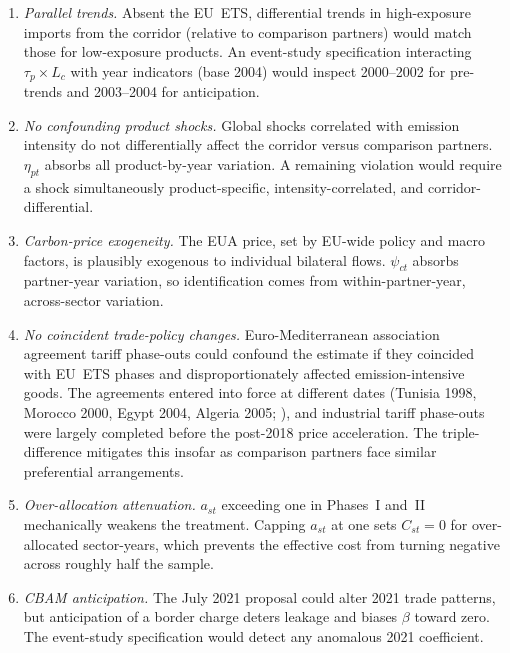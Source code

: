 \begin{enumerate}

\item \emph{Parallel trends.} Absent the EU~ETS, differential trends in high-exposure imports from the corridor (relative to comparison partners) would match those for low-exposure products. An event-study specification interacting $\tau_p \times L_c$ with year indicators (base 2004) would inspect 2000--2002 for pre-trends and 2003--2004 for anticipation.

\item \emph{No confounding product shocks.} Global shocks correlated with emission intensity do not differentially affect the corridor versus comparison partners. $\eta_{pt}$ absorbs all product-by-year variation. A remaining violation would require a shock simultaneously product-specific, intensity-correlated, and corridor-differential.

\item \emph{Carbon-price exogeneity.} The EUA price, set by EU-wide policy and macro factors, is plausibly exogenous to individual bilateral flows. $\psi_{ct}$ absorbs partner-year variation, so identification comes from within-partner-year, across-sector variation.

\item \emph{No coincident trade-policy changes.} Euro-Mediterranean association agreement tariff phase-outs could confound the estimate if they coincided with EU~ETS phases and disproportionately affected emission-intensive goods. The agreements entered into force at different dates (Tunisia 1998, Morocco 2000, Egypt 2004, Algeria 2005; \citealp{eumed}), and industrial tariff phase-outs were largely completed before the post-2018 price acceleration. The triple-difference mitigates this insofar as comparison partners face similar preferential arrangements.

\item \emph{Over-allocation attenuation.} $a_{st}$ exceeding one in Phases~I and~II mechanically weakens the treatment. Capping $a_{st}$ at one sets $C_{st} = 0$ for over-allocated sector-years, which prevents the effective cost from turning negative across roughly half the sample.

\item \emph{CBAM anticipation.} The July 2021 proposal could alter 2021 trade patterns, but anticipation of a border charge deters leakage and biases $\beta$ toward zero. The event-study specification would detect any anomalous 2021 coefficient.


\end{enumerate}
